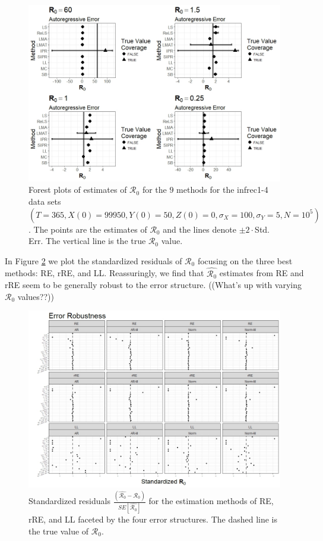 \documentclass[12pt]{article}
\newcommand{\xxsir}{\ensuremath{9} } %
\newcommand{\rr}{\ensuremath{\mathcal{R}_0}}
\begin{document}
\begin{figure}[H]
	\centering
	\includegraphics[scale=0.5]{images/parchange_ar.jpeg}
	\caption{Forest plots of estimates of $\rr$ for the \xxsir methods for the infrec1-4 data sets $(T=365, X(0)=99950, Y(0)=50, Z(0)=0, \sigma_X=100, \sigma_Y=5, N=10^5)$.  The points are the estimates of $\rr$ and the lines denote $\pm 2\cdot $Std. Err.  The vertical line is the true $\rr$ value.}\label{fig:ar-r0}
\end{figure}


 In Figure \ref{fig:err-rob} we plot the standardized residuals of $\rr$ focusing on the three best methods: RE, rRE, and LL.  Reassuringly, we find that $\hat{\rr}$ estimates from RE and rRE seem to be generally robust to the error structure.  ((What's up with varying $\rr$ values??))

\begin{figure}[H]
	\centering
	\includegraphics[scale=0.5]{images/err_robust.jpeg}
	\caption{Standardized residuals $\frac{\left ( \hat{\rr} - \rr\right ) }{SE \left [\hat{\rr}\right ]}$ for the estimation methods of RE, rRE, and LL faceted by the four error structures.  The dashed line is the true value of $\rr$.}\label{fig:err-rob}
\end{figure}
\end{document}
